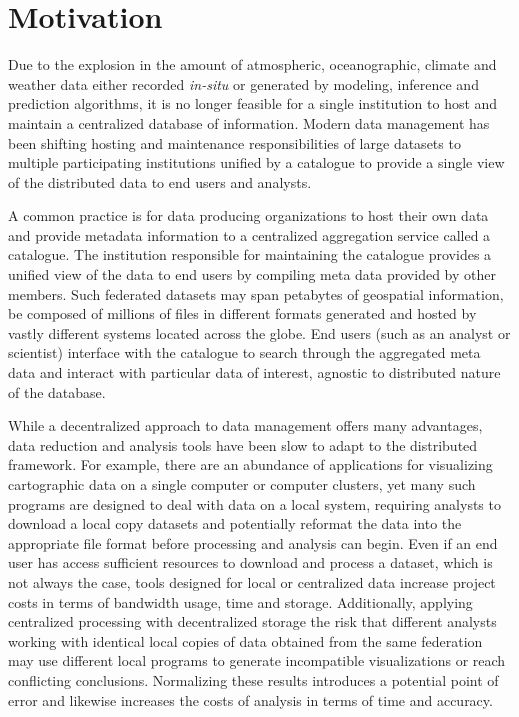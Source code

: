 \section{Motivation}
\label{sec:motivation}
Due to the explosion in the amount of atmospheric, oceanographic,
climate and weather data either recorded \emph{in-situ} or generated
by modeling, inference and prediction algorithms, it is no longer
feasible for a single institution to host and maintain a centralized
database of information. Modern data management has been shifting
hosting and maintenance responsibilities of large datasets to multiple
participating institutions unified by a catalogue to provide a single
view of the distributed data to end users and analysts.

A common practice is for data producing organizations to host their
own data and provide metadata information to a centralized aggregation
service called a catalogue. The institution responsible for
maintaining the catalogue provides a unified view of the data to end
users by compiling meta data provided by other members. Such federated
datasets may span petabytes of geospatial information, be composed of
millions of files in different formats generated and hosted by vastly
different systems located across the globe. End users (such as an
analyst or scientist) interface with the catalogue to search through
the aggregated meta data and interact with particular data of
interest, agnostic to distributed nature of the database.

While a decentralized approach to data management offers many
advantages, data reduction and analysis tools have been slow to adapt
to the distributed framework. For example, there are an abundance of
applications for visualizing cartographic data on a single computer or
computer clusters, yet many such programs are designed to deal with
data on a local system, requiring analysts to download a local copy
datasets and potentially reformat the data into the appropriate file
format before processing and analysis can begin. Even if an end user
has access sufficient resources to download and process a dataset,
which is not always the case, tools designed for local or centralized
data increase project costs in terms of bandwidth usage, time and
storage. Additionally, applying centralized processing with
decentralized storage the risk that different analysts working with
identical local copies of data obtained from the same federation may
use different local programs to generate incompatible visualizations
or reach conflicting conclusions. Normalizing these results introduces
a potential point of error and likewise increases the costs of
analysis in terms of time and accuracy.

